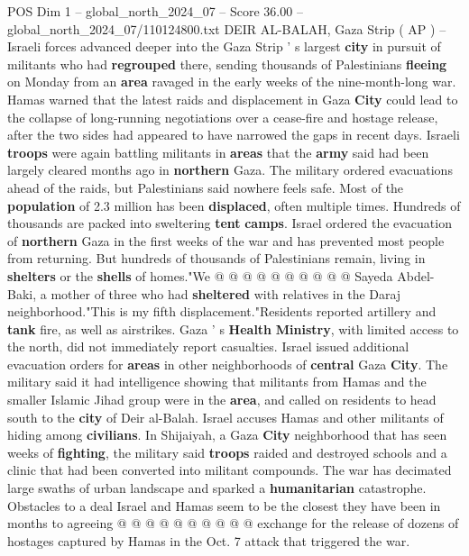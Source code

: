 \begin{textsample}{POS Dim 1 – global\_north\_2024\_07 – Score 36.00 – global\_north\_2024\_07/110124800.txt}  \label{ex:f1_pos_382}
DEIR AL-BALAH, Gaza Strip ( AP ) -- Israeli forces advanced deeper into the Gaza Strip ' s largest \textbf{city} in pursuit of militants who had \textbf{regrouped} there, sending thousands of Palestinians \textbf{fleeing} on Monday from an \textbf{area} ravaged in the early weeks of the nine-month-long war.
Hamas warned that the latest raids and displacement in Gaza \textbf{City} could lead to the collapse of long-running negotiations over a cease-fire and hostage release, after the two sides had appeared to have narrowed the gaps in recent days.
Israeli \textbf{troops} were again battling militants in \textbf{areas} that the \textbf{army} said had been largely cleared months ago in \textbf{northern} Gaza.
The military ordered evacuations ahead of the raids, but Palestinians said nowhere feels safe.
Most of the \textbf{population} of 2.3 million has been \textbf{displaced}, often multiple times.
Hundreds of thousands are packed into sweltering \textbf{tent} \textbf{camps}.
Israel ordered the evacuation of \textbf{northern} Gaza in the first weeks of the war and has prevented most people from returning.
But hundreds of thousands of Palestinians remain, living in \textbf{shelters} or the \textbf{shells} of homes."We @ @ @ @ @ @ @ @ @ @ Sayeda Abdel-Baki, a mother of three who had \textbf{sheltered} with relatives in the Daraj neighborhood."This is my fifth displacement."Residents reported artillery and \textbf{tank} fire, as well as airstrikes.
Gaza ' s \textbf{Health} \textbf{Ministry}, with limited access to the north, did not immediately report casualties.
Israel issued additional evacuation orders for \textbf{areas} in other neighborhoods of \textbf{central} Gaza \textbf{City}.
The military said it had intelligence showing that militants from Hamas and the smaller Islamic Jihad group were in the \textbf{area}, and called on residents to head south to the \textbf{city} of Deir al-Balah.
Israel accuses Hamas and other militants of hiding among \textbf{civilians}.
In Shijaiyah, a Gaza \textbf{City} neighborhood that has seen weeks of \textbf{fighting}, the military said \textbf{troops} raided and destroyed schools and a clinic that had been converted into militant compounds.
The war has decimated large swaths of urban landscape and sparked a \textbf{humanitarian} catastrophe.
Obstacles to a deal Israel and Hamas seem to be the closest they have been in months to agreeing @ @ @ @ @ @ @ @ @ @ exchange for the release of dozens of hostages captured by Hamas in the Oct. 7 attack that triggered the war.

\end{textsample}
